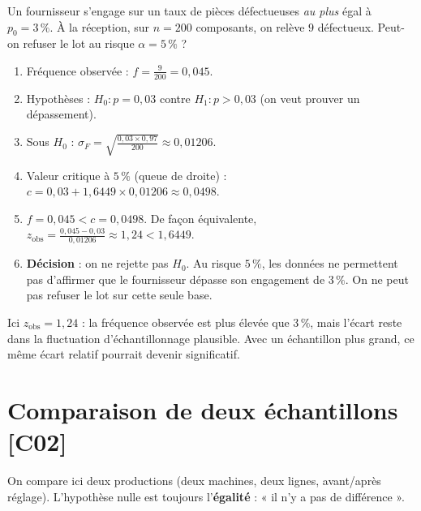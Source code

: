 \documentclass[a4paper,11pt]{article}
\begin{document}
\begin{exemple}
Un fournisseur s'engage sur un taux de pièces défectueuses \emph{au plus} égal à $p_0 = 3\,\%$. À la réception, sur $n = 200$ composants, on relève $9$ défectueux. Peut-on refuser le lot au risque $\alpha = 5\,\%$ ?
\begin{enumerate}
  \item Fréquence observée : $f = \frac{9}{200} = 0{,}045$.
  \item Hypothèses : $H_0 : p = 0{,}03$ contre $H_1 : p > 0{,}03$ (on veut prouver un dépassement).
  \item Sous $H_0$ : $\sigma_F = \sqrt{\frac{0{,}03 \times 0{,}97}{200}} \approx 0{,}01206$.
  \item Valeur critique à $5\,\%$ (queue de droite) : $c = 0{,}03 + 1{,}6449 \times 0{,}01206 \approx 0{,}0498$.
  \item $f = 0{,}045 < c = 0{,}0498$. De façon équivalente, $z_{\text{obs}} = \frac{0{,}045 - 0{,}03}{0{,}01206} \approx 1{,}24 < 1{,}6449$.
  \item \textbf{Décision} : on ne rejette pas $H_0$. Au risque $5\,\%$, les données ne permettent pas d'affirmer que le fournisseur dépasse son engagement de $3\,\%$. On ne peut pas refuser le lot sur cette seule base.
\end{enumerate}
\end{exemple}

\begin{remarque}
Ici $z_{\text{obs}} = 1{,}24$ : la fréquence observée est plus élevée que $3\,\%$, mais l'écart reste dans la fluctuation d'échantillonnage plausible. Avec un échantillon plus grand, ce même écart relatif pourrait devenir significatif.
\end{remarque}

\newpage
\section{Comparaison de deux échantillons \hfill {\normalsize\color{uimmred}[C02]}}

On compare ici deux productions (deux machines, deux lignes, avant/après réglage). L'hypothèse nulle est toujours l'\textbf{égalité} : « il n'y a pas de différence ».
\end{document}
